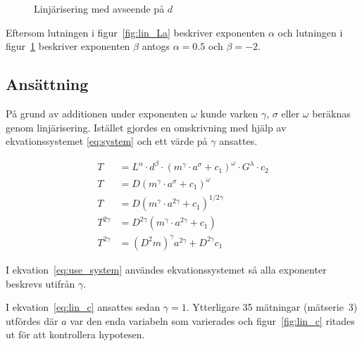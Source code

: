 \documentclass[a4paper,12pt]{article}
\begin{document}
\begin{figure}
  \caption{Linjärisering med avseende på $d$}
  \label{fig:lin_db}
\end{figure}

Eftersom lutningen i figur~\ref{fig:lin_La} beskriver exponenten $\alpha$ och
lutningen i figur~\ref{fig:lin_db} beskriver exponenten $\beta$ antogs $\alpha =
0.5$ och $\beta = -2$.

\subsection{Ansättning}

På grund av additionen under exponenten $\omega$ kunde varken $\gamma$, $\sigma$ eller $\omega$
beräknas genom linjärisering. Istället gjordes en omskrivning med hjälp av
ekvationssystemet \eqref{eq:system} och ett värde på $\gamma$ ansattes.

\begin{align}
  T &= L^\alpha \cdot d^\beta \cdot (m^\gamma \cdot a^\sigma + c_1)^\omega \cdot G^\lambda  \cdot c_2\nonumber \\
  T &= D (m^\gamma \cdot a^\sigma + c_1)^\omega \nonumber \\
  T &= D (m^\gamma \cdot a^{2\gamma} + c_1)^{1/2\gamma} \label{eq:use_system} \\
  T^{2\gamma} &= D^{2\gamma} (m^\gamma \cdot a^{2\gamma} + c_1) \nonumber \\
  T^{2\gamma} &= (D^2m)^\gamma a^{2\gamma} + D^{2\gamma}c_1 \label{eq:lin_c}
\end{align}

I ekvation~\eqref{eq:use_system} användes ekvationssystemet så alla exponenter
beskrevs utifrån $\gamma$.

I ekvation~\eqref{eq:lin_c} ansattes sedan $\gamma = 1$. Ytterligare 35 mätningar (mätserie~3)
utfördes där $a$ var den enda variabeln som varierades och figur~\ref{fig:lin_c}
ritades ut för att kontrollera hypotesen.
\end{document}
